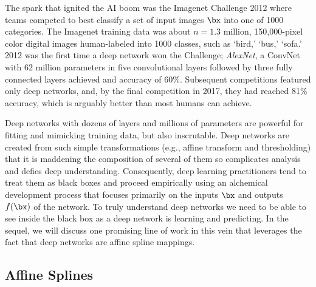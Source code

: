 \documentclass{notices}
\begin{document}
The spark that ignited the AI boom was the Imagenet Challenge 2012 where teams competed to best classify a set of input images $\bx$ into one of 1000 categories.
The Imagenet training data was about $n=1.3$ million, 150,000-pixel color digital images human-labeled into 1000 classes, such as `bird,' `bus,' `sofa.'
2012 was the first time a deep network won the Challenge; {\em AlexNet}, a ConvNet with 62 million parameters in five convolutional layers followed by three fully connected layers
achieved and accuracy of 60\%.
Subsequent competitions featured only deep networks, and, by the final  competition in 2017, they had reached 81\% accuracy, which is arguably better than most humans can achieve.

Deep networks with dozens of layers and millions of parameters are powerful for fitting and mimicking training data, but also inscrutable. 
Deep networks are created from such simple transformations (e.g., affine transform and thresholding) that it is maddening the composition of several of them so complicates analysis and defies deep understanding.
Consequently, deep learning practitioners tend to treat them as black boxes and proceed empirically using an alchemical development process that focuses primarily on the inputs $\bx$ and outputs $f(\bx)$ of the network.
To truly understand deep networks we need to be able to see inside the black box as a deep network is learning and predicting.
In the sequel, we will discuss one promising line of work in this vein that leverages the fact that deep networks are affine spline mappings.


\subsection*{Affine Splines}
\end{document}
